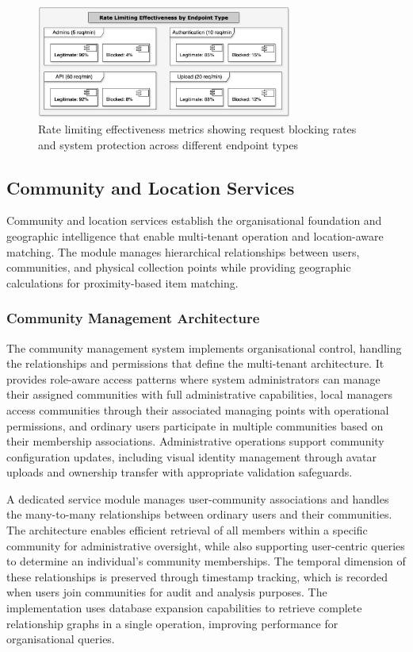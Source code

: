 \begin{figure}[htbp]
    \centering
    \includegraphics[width=0.75\textwidth]{figs/chapter4/rate_limiting_chart.png}
    \caption[Rate Limiting Effectiveness]{Rate limiting effectiveness metrics showing request blocking rates and system protection across different endpoint types}
    \label{fig:rate_limiting_effectiveness}
\end{figure}

\subsection{Community and Location Services} \label{subsection:community_location_services}

Community and location services establish the organisational foundation and geographic intelligence that enable multi-tenant operation and location-aware matching. The module manages hierarchical relationships between users, communities, and physical collection points while providing geographic calculations for proximity-based item matching.

\subsubsection{Community Management Architecture}

The community management system implements organisational control, handling the relationships and permissions that define the multi-tenant architecture. It provides role-aware access patterns where system administrators can manage their assigned communities with full administrative capabilities, local managers access communities through their associated managing points with operational permissions, and ordinary users participate in multiple communities based on their membership associations. Administrative operations support community configuration updates, including visual identity management through avatar uploads and ownership transfer with appropriate validation safeguards.

A dedicated service module manages user-community associations and handles the many-to-many relationships between ordinary users and their communities. The architecture enables efficient retrieval of all members within a specific community for administrative oversight, while also supporting user-centric queries to determine an individual's community memberships. The temporal dimension of these relationships is preserved through timestamp tracking, which is recorded when users join communities for audit and analysis purposes. The implementation uses database expansion capabilities to retrieve complete relationship graphs in a single operation, improving performance for organisational queries.

